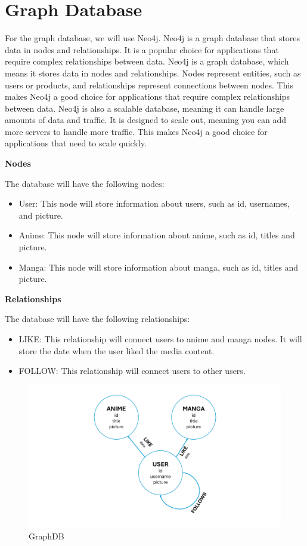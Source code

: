 \section{Graph Database}
For the graph database, we will use Neo4j. Neo4j is a graph database that stores data in nodes and relationships. It is a popular choice for applications that require complex relationships between data. Neo4j is a graph database, which means it stores data in nodes and relationships. Nodes represent entities, such as users or products, and relationships represent connections between nodes. This makes Neo4j a good choice for applications that require complex relationships between data. Neo4j is also a scalable database, meaning it can handle large amounts of data and traffic. It is designed to scale out, meaning you can add more servers to handle more traffic. This makes Neo4j a good choice for applications that need to scale quickly.



\textbf{Nodes}



The database will have the following nodes:
\begin{itemize}
    \item User: This node will store information about users, such as id, usernames, and picture.
    \item Anime: This node will store information about anime, such as id, titles and picture.
    \item Manga: This node will store information about manga, such as id, titles and picture.
\end{itemize}

\textbf{Relationships}


The database will have the following relationships:
\begin{itemize}
    \item LIKE: This relationship will connect users to anime and manga nodes. It will store the date when the user liked the media content.
    \item FOLLOW: This relationship will connect users to other users. 
\end{itemize}

\begin{figure}[htbp]
    \centering
    \includegraphics[width=\textwidth]{Media/graph.pdf}
    \caption{GraphDB}
    \label{fig:GraohDB}
\end{figure}

